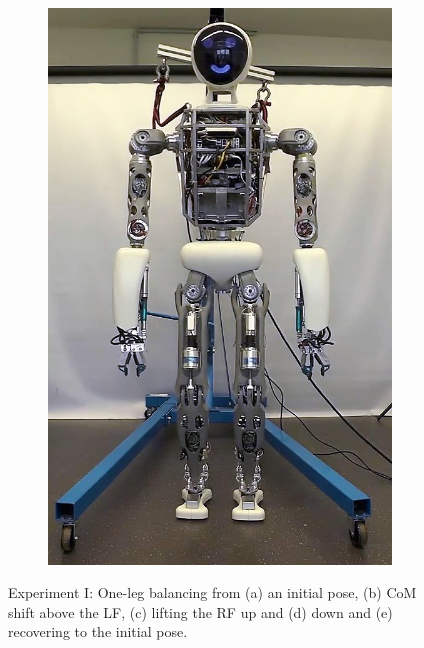\begin{figure}
\begin{subfigure}{.2\textwidth}
	\includegraphics[width=.95\linewidth]{experiments/balancing/snaps/5}
	\caption{}
	\end{subfigure}%
\caption[Experiment I: One-leg balancing]{Experiment I: One-leg balancing from (a) an initial pose, (b) \gls{CoM} shift above the \gls{LF}, (c) lifting the \gls{RF} up and (d) down and (e) recovering to the initial pose.} 
\label{exp:balancingSnaps}
\end{figure} 

